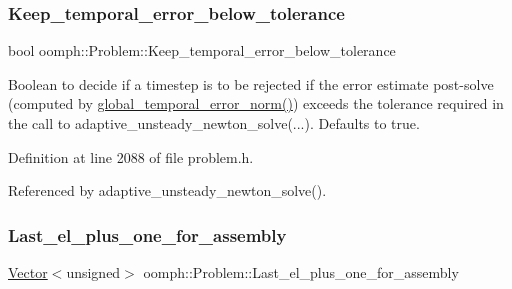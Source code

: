 \mbox{\label{classoomph_1_1Problem_ab27af4a444de9f59125ee50ac778d97a}} 
\subsubsection{\texorpdfstring{Keep\+\_\+temporal\+\_\+error\+\_\+below\+\_\+tolerance}{Keep\_temporal\_error\_below\_tolerance}}
{\footnotesize\ttfamily bool oomph\+::\+Problem\+::\+Keep\+\_\+temporal\+\_\+error\+\_\+below\+\_\+tolerance\hspace{0.3cm}{\ttfamily [protected]}}



Boolean to decide if a timestep is to be rejected if the error estimate post-\/solve (computed by \hyperlink{classoomph_1_1Problem_ac7667864b71a3889c95c29307422ac8e}{global\+\_\+temporal\+\_\+error\+\_\+norm()}) exceeds the tolerance required in the call to adaptive\+\_\+unsteady\+\_\+newton\+\_\+solve(...). Defaults to true. 



Definition at line 2088 of file problem.\+h.



Referenced by adaptive\+\_\+unsteady\+\_\+newton\+\_\+solve().

\mbox{\label{classoomph_1_1Problem_a4842a9a213197905b5a8e182a3c02cce}} 
\subsubsection{\texorpdfstring{Last\+\_\+el\+\_\+plus\+\_\+one\+\_\+for\+\_\+assembly}{Last\_el\_plus\_one\_for\_assembly}}
{\footnotesize\ttfamily \hyperlink{classoomph_1_1Vector}{Vector}$<$unsigned$>$ oomph\+::\+Problem\+::\+Last\+\_\+el\+\_\+plus\+\_\+one\+\_\+for\+\_\+assembly\hspace{0.3cm}{\ttfamily [private]}}




